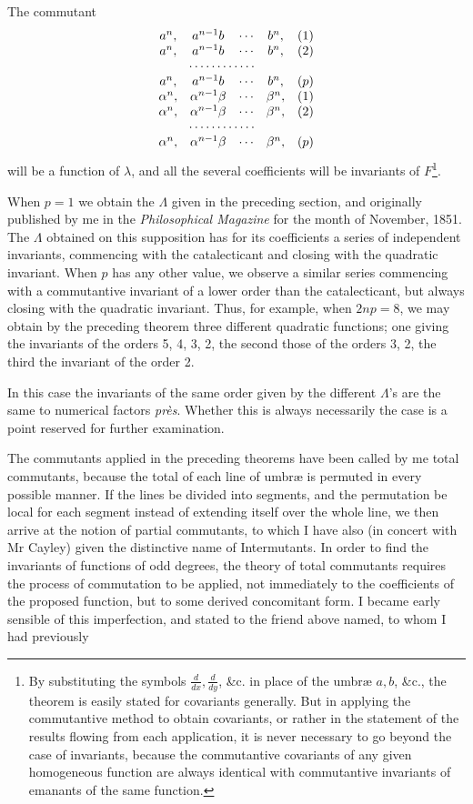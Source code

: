 \documentclass[11pt]{article}
\newcommand{\sourcepage}[1]{\marginpar{\scriptsize p.~#1}}
\begin{document}
\sourcepage{317}
The commutant
\[
\begin{array}{ccccr}
a^n,&a^{n-1}b&\cdots&b^n,&(1)\\
a^n,&a^{n-1}b&\cdots&b^n,&(2)\\
\multicolumn{4}{c}{\cdots\cdots\cdots\cdots}&\\
a^n,&a^{n-1}b&\cdots&b^n,&(p)\\
\alpha^n,&\alpha^{n-1}\beta&\cdots&\beta^n,&(1)\\
\alpha^n,&\alpha^{n-1}\beta&\cdots&\beta^n,&(2)\\
\multicolumn{4}{c}{\cdots\cdots\cdots\cdots}&\\
\alpha^n,&\alpha^{n-1}\beta&\cdots&\beta^n,&(p)
\end{array}
\]
will be a function of $\lambda$, and all the several coefficients will be invariants of $F$\footnote{By substituting the symbols $\frac{d}{dx},\frac{d}{dy}$, \&c. in place of the umbræ $a,b$, \&c., the theorem is easily stated for covariants generally. But in applying the commutantive method to obtain covariants, or rather in the statement of the results flowing from each application, it is never necessary to go beyond the case of invariants, because the commutantive covariants of any given homogeneous function are always identical with commutantive invariants of emanants of the same function.}.

When $p=1$ we obtain the $\Lambda$ given in the preceding section, and originally published by me in the \emph{Philosophical Magazine} for the month of November, 1851. The $\Lambda$ obtained on this supposition has for its coefficients a series of independent invariants, commencing with the catalecticant and closing with the quadratic invariant. When $p$ has any other value, we observe a similar series commencing with a commutantive invariant of a lower order than the catalecticant, but always closing with the quadratic invariant. Thus, for example, when $2np=8$, we may obtain by the preceding theorem three different quadratic functions; one giving the invariants of the orders 5, 4, 3, 2, the second those of the orders 3, 2, the third the invariant of the order 2.

In this case the invariants of the same order given by the different $\Lambda$'s are the same to numerical factors \emph{près}. Whether this is always necessarily the case is a point reserved for further examination.

The commutants applied in the preceding theorems have been called by me total commutants, because the total of each line of umbræ is permuted in every possible manner. If the lines be divided into segments, and the permutation be local for each segment instead of extending itself over the whole line, we then arrive at the notion of partial commutants, to which I have also (in concert with Mr Cayley) given the distinctive name of Intermutants. In order to find the invariants of functions of odd degrees, the theory of total commutants requires the process of commutation to be applied, not immediately to the coefficients of the proposed function, but to some derived concomitant form. I became early sensible of this imperfection, and stated to the friend above named, to whom I had previously
\end{document}
